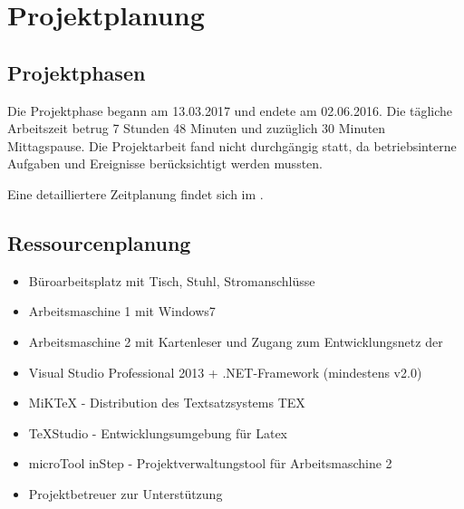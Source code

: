 
\clearpage
\section{Projektplanung} 
\label{sec:Projektplanung}


\subsection{Projektphasen}
\label{sec:Projektphasen}

Die Projektphase begann am 13.03.2017 und endete am 02.06.2016.
Die tägliche Arbeitszeit betrug 7 Stunden 48 Minuten und zuzüglich 30 Minuten Mittagspause.
Die Projektarbeit fand nicht durchgängig statt, da betriebsinterne Aufgaben und Ereignisse berücksichtigt werden mussten.


Eine detailliertere Zeitplanung findet sich im .

%

\subsection{Ressourcenplanung}
\label{sec:Ressourcenplanung}

\begin{itemize}
\renewcommand{\labelitemi}{}
\renewcommand{\labelitemii}{\textbullet}
\renewcommand{\labelitemiii}{\normalfont\bfseries\textendash}
		\begin{itemize}
			\item Büroarbeitsplatz mit Tisch, Stuhl, Stromanschlüsse
			\item Arbeitsmaschine 1 mit Windows7
			\item Arbeitsmaschine 2 mit Kartenleser und Zugang zum Entwicklungsnetz der \DRV
		\end{itemize}
\clearpage
		\begin{itemize}
			\item Visual Studio Professional 2013 + .NET-Framework (mindestens v2.0)
			\item MiKTeX - Distribution des Textsatzsystems TEX
			\item TeXStudio - Entwicklungsumgebung für Latex
			\item microTool inStep - Projektverwaltungstool für Arbeitsmaschine 2
		\end{itemize}
		\begin{itemize}
			\item Projektbetreuer zur Unterstützung
		\end{itemize}
\end{itemize}

